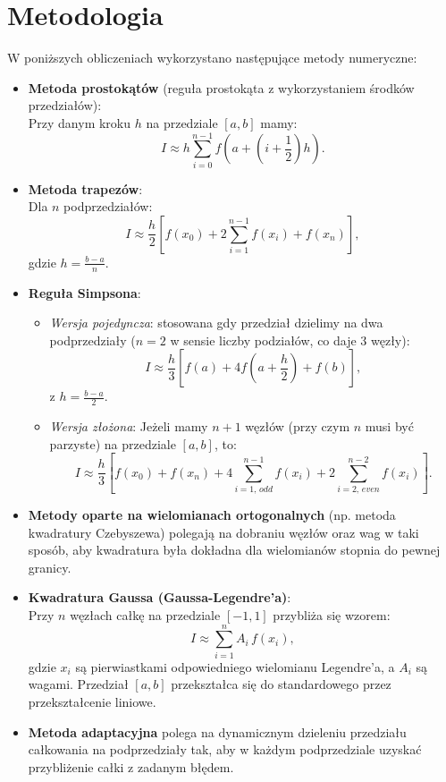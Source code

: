 \documentclass[a4paper,12pt]{article}
\begin{document}
\section{Metodologia}
W poniższych obliczeniach wykorzystano następujące metody numeryczne:
\begin{itemize}
    \item \textbf{Metoda prostokątów} (reguła prostokąta z wykorzystaniem środków przedziałów):\\
    Przy danym kroku \(h\) na przedziale \([a,b]\) mamy:
    \[
    I \approx h \sum_{i=0}^{n-1} f\left(a + \left(i+\frac{1}{2}\right)h\right).
    \]
    
    \item \textbf{Metoda trapezów}:\\
    Dla \(n\) podprzedziałów:
    \[
    I \approx \frac{h}{2}\left[f(x_0) + 2\sum_{i=1}^{n-1}f(x_i)+ f(x_n)\right],
    \]
    gdzie \(h=\frac{b-a}{n}\).

    \item \textbf{Reguła Simpsona}:\\
    \begin{itemize}
        \item \textit{Wersja pojedyncza}: stosowana gdy przedział dzielimy na dwa podprzedziały (\(n=2\) w sensie liczby podziałów, co daje 3 węzły):
        \[
        I \approx \frac{h}{3}\left[f(a)+4f\left(a+\frac{h}{2}\right)+f(b)\right],
        \]
        z \(h=\frac{b-a}{2}\).
        \item \textit{Wersja złożona}: Jeżeli mamy \(n+1\) węzłów (przy czym \(n\) musi być parzyste) na przedziale \([a,b]\), to:
        \[
        I \approx \frac{h}{3}\left[f(x_0) + f(x_n) + 4\sum_{i=1,\, odd} ^{n-1} f(x_i) + 2\sum_{i=2,\, even}^{n-2} f(x_i)\right].
        \]
    \end{itemize}

    \item \textbf{Metody oparte na wielomianach ortogonalnych} (np. metoda kwadratury Czebyszewa) polegają na dobraniu węzłów oraz wag w taki sposób, aby kwadratura była dokładna dla wielomianów stopnia do pewnej granicy.

    \item \textbf{Kwadratura Gaussa (Gaussa-Legendre'a)}:\\
    Przy \(n\) węzłach całkę na przedziale \([-1,1]\) przybliża się wzorem:
    \[
    I \approx \sum_{i=1}^{n} A_i\, f(x_i),
    \]
    gdzie \(x_i\) są pierwiastkami odpowiedniego wielomianu Legendre'a, a \(A_i\) są wagami. Przedział \([a,b]\) przekształca się do standardowego przez przekształcenie liniowe.

    \item \textbf{Metoda adaptacyjna} polega na dynamicznym dzieleniu przedziału całkowania na podprzedziały tak, aby w każdym podprzedziale uzyskać przybliżenie całki z zadanym błędem.
\end{itemize}
\end{document}
